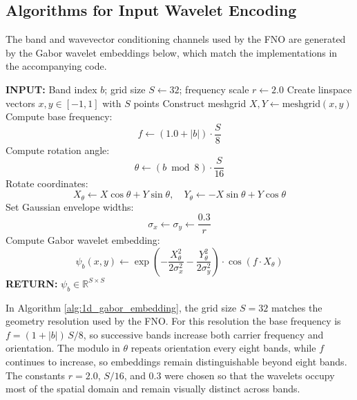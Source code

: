 \documentclass[preprint,review,12pt,numafflabel]{elsarticle}
\begin{document}
\subsection{Algorithms for Input Wavelet Encoding}
\label{ssec:input_wavelet_algorithms}
The band and wavevector conditioning channels used by the FNO are generated by the Gabor wavelet embeddings below, which match the implementations in the accompanying code.
\begin{algorithm}[H]
\caption{1D Gabor Wavelet Embedding from Band Index}
\label{alg:1d_gabor_embedding}
\begin{algorithmic}[1]
\STATE \textbf{INPUT:} Band index \( b \); grid size \( S \leftarrow 32 \); frequency scale \( r \leftarrow 2.0 \)
\STATE Create linspace vectors \( x, y \in [-1, 1] \) with \( S \) points
\STATE Construct meshgrid \( X, Y \leftarrow \text{meshgrid}(x, y) \)
\STATE Compute base frequency:
\[
f \leftarrow (1.0 + |b|) \cdot \frac{S}{8}
\]
\STATE Compute rotation angle:
\[
\theta \leftarrow (b \bmod 8) \cdot \frac{S}{16}
\]
\STATE Rotate coordinates:
\[
X_\theta \leftarrow X \cos \theta + Y \sin \theta, \quad
Y_\theta \leftarrow -X \sin \theta + Y \cos \theta
\]
\STATE Set Gaussian envelope widths:
\[
\sigma_x \leftarrow \sigma_y \leftarrow \frac{0.3}{r}
\]
\STATE Compute Gabor wavelet embedding:
\[
\psi_b(x, y) \leftarrow
\exp\left(-\frac{X_\theta^2}{2 \sigma_x^2} - \frac{Y_\theta^2}{2 \sigma_y^2}\right)
\cdot \cos(f \cdot X_\theta)
\]
\STATE \textbf{RETURN:} \( \psi_b \in \mathbb{R}^{S \times S} \)
\end{algorithmic}
\end{algorithm}

In Algorithm \ref{alg:1d_gabor_embedding}, the grid size \(S=32\) matches the geometry resolution used by the FNO. For this resolution the base frequency is \(f=(1+|b|)\,S/8\), so successive bands increase both carrier frequency and orientation. The modulo in \(\theta\) repeats orientation every eight bands, while \(f\) continues to increase, so embeddings remain distinguishable beyond eight bands. The constants \(r=2.0\), \(S/16\), and \(0.3\) were chosen so that the wavelets occupy most of the spatial domain and remain visually distinct across bands.
\end{document}
